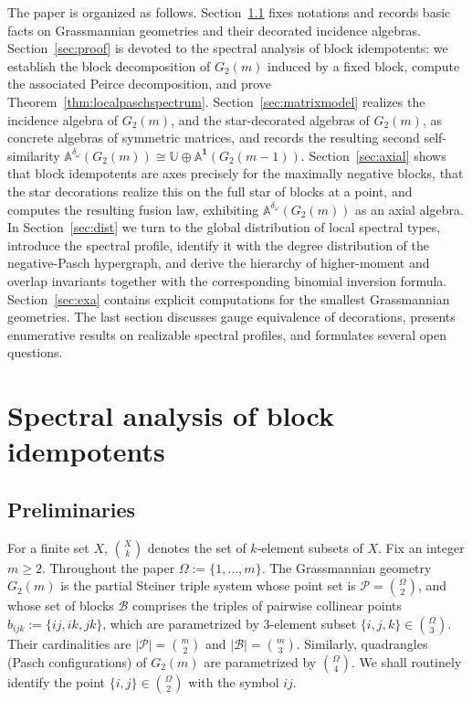 \documentclass[times,11pt,reqno]{amsproc}
\theoremstyle{definition}
\numberwithin{equation}{section}
\def\alg{\mathbb{A}}
\def\ualg{\mathbb{U}}
\def\ualg{\mathbb{U}}
\begin{document}
\medskip
The paper is organized as follows. Section~\ref{sec:not} fixes notations and records basic facts on Grassmannian geometries and their decorated incidence algebras. Section~\ref{sec:proof} is devoted to the spectral analysis of block idempotents: we establish the block decomposition of $G_2(m)$ induced by a fixed block, compute the associated Peirce decomposition, and prove Theorem~\ref{thm:localpaschspectrum}. Section~\ref{sec:matrixmodel} realizes the incidence algebra of $G_2(m)$, and the star-decorated algebras of $G_2(m)$, as concrete algebras of symmetric matrices, and records the resulting second self-similarity $\alg^{\delta_\omega}(G_2(m))\cong\ualg\oplus\alg^{\mathbf1}(G_2(m-1))$. Section~\ref{sec:axial} shows that block idempotents are axes precisely for the maximally negative blocks, that the star decorations realize this on the full star of blocks at a point, and computes the resulting fusion law, exhibiting $\alg^{\delta_\omega}(G_2(m))$ as an axial algebra. In Section~\ref{sec:dist} we turn to the global distribution of local spectral types, introduce the spectral profile, identify it with the degree distribution of the negative-Pasch hypergraph, and derive the hierarchy of higher-moment and overlap invariants together with the corresponding binomial inversion formula. Section~\ref{sec:exa} contains explicit computations for the smallest Grassmannian geometries. The last section discusses gauge equivalence of decorations, presents enumerative results on realizable spectral profiles, and formulates several open questions.


\section{Spectral analysis of block idempotents}

\subsection{Preliminaries}\label{sec:not}

For a finite set $X$, $\binom{X}{k}$ denotes the set of $k$-element subsets of $X$. Fix an integer $m\ge2$. Throughout the paper $\Omega:=\{1,\dots,m\}$.
The Grassmannian geometry $G_2(m)$ is the partial Steiner triple system whose point set is
$\mathcal P=\binom{\Omega}{2}$,
and whose set of blocks $\mathcal B$ comprises the triples of pairwise collinear points
$b_{ijk}:=\{ij,ik,jk\}$, which are parametrized by $3$-element subset $\{i,j,k\}\in\binom{\Omega}{3}$. Their cardinalities are $|\mathcal P|=\binom{m}{2}$ and $|\mathcal B|=\binom{m}{3}$.
Similarly, quadrangles (Pasch configurations) of $G_2(m)$ are parametrized by $\binom{\Omega}{4}$. We shall routinely identify the point $\{i,j\}\in\binom{\Omega}{2}$ with the symbol $ij$.
\end{document}
